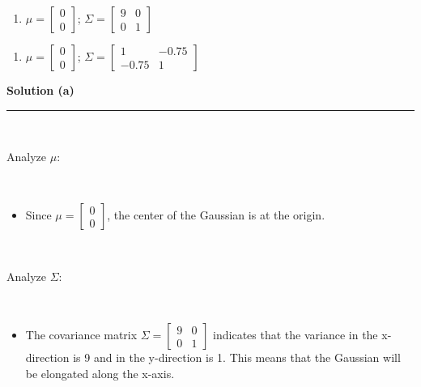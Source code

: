 \documentclass{article}
\begin{document}
\begin{enumerate}[label=(a)]
    \item $\mu = \begin{bmatrix} 0 \\ 0 \end{bmatrix}$; $\Sigma = \begin{bmatrix} 9 & 0 \\ 0 & 1 \end{bmatrix}$\\
\end{enumerate}

\begin{enumerate}[label=(b)]
    \item $\mu = \begin{bmatrix} 0 \\ 0 \end{bmatrix}$; $\Sigma = \begin{bmatrix} 1 & -0.75 \\ -0.75 & 1 \end{bmatrix}$\\
\end{enumerate}

\parbox{\textwidth}{\textbf{Solution (a)}}

\noindent\rule{\textwidth}{0.4pt}\\

\parbox{\textwidth}{Analyze $\mu$:}\\
\begin{itemize}
    \item \parbox{\textwidth}{Since $\mu = \begin{bmatrix} 0 \\ 0 \end{bmatrix}$, the center of the Gaussian is at the origin.}\\
\end{itemize}

\parbox{\textwidth}{Analyze $\Sigma$:}\\

\begin{itemize}
    \item \parbox{\textwidth}{The covariance matrix $\Sigma = \begin{bmatrix} 9 & 0 \\ 0 & 1 \end{bmatrix}$ indicates that the variance in the x-direction is 9 and in the y-direction is 1. This means that the Gaussian will be elongated along the x-axis.}\\
\end{itemize}
\end{document}

